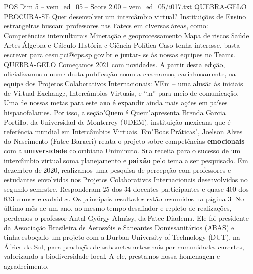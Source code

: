 \begin{textsample}{POS Dim 5 – vem\_ed\_05 – Score 2.00 – vem\_ed\_05/t017.txt}  \label{ex:f5_pos_071}
QUEBRA-GELO PROCURA-SE Quer desenvolver um intercâmbio virtual?
Instituições de Ensino estrangeiras buscam professores nas Fatecs em diversas áreas, como: Competências interculturais Mineração e geoprocessamento Mapa de riscos Saúde Artes Álgebra e Cálculo História e Ciência Política Caso tenha interesse, basta escrever para cesu.pci@cps.sp.gov.br e juntar- se às nossas equipes no Teams.
QUEBRA-GELO Começamos 2021 com novidades.
A partir desta edição, oficializamos o nome desta publicação como a chamamos, carinhosamente, na equipe dos Projetos Colaborativos Internacionais: VEm – uma alusão às iniciais de Virtual Exchange, Intercâmbios Virtuais, e “m” para meio de comunicação.
Uma de nossas metas para este ano é expandir ainda mais ações em países hispanofalantes.
Por isso, a seção"Quem é Quem"apresenta Brenda Garcia Portillo, da Universidad de Monterrey (UDEM), instituição mexicana que é referência mundial em Intercâmbios Virtuais.
Em"Boas Práticas", Joelson Alves do Nascimento (Fatec Barueri) relata o projeto sobre competências \textbf{emocionais} com a \textbf{universidade} colombiana Uniminuto.
Sua receita para o sucesso de um intercâmbio virtual soma planejamento e \textbf{paixão} pelo tema a ser pesquisado.
Em dezembro de 2020, realizamos uma pesquisa de percepção com professores e estudantes envolvidos nos Projetos Colaborativos Internacionais desenvolvidos no segundo semestre.
Responderam 25 dos 34 docentes participantes e quase 400 dos 833 alunos envolvidos.
Os principais resultados estão resumidos na página 3.
No último mês de um ano, ao mesmo tempo desafiador e repleto de realizações, perdemos o professor Antal György Almásy, da Fatec Diadema.
Ele foi presidente da Associação Brasileira de Aerossóis e Saneantes Domissanitários (ABAS) e tinha esboçado um projeto com a Durban University of Technology (DUT), na África do Sul, para produção de sabonetes artesanais por comunidades carentes, valorizando a biodiversidade local.
A ele, prestamos nossa homenagem e agradecimento.

\end{textsample}
